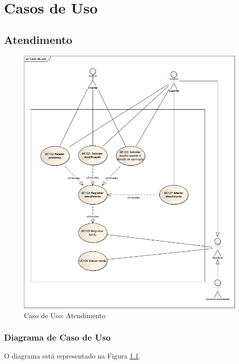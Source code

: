 
\appendix
\chapter{Casos de Uso}

\section{Atendimento}
\label{Sec:uc:atendimento}

\begin{figure}[!h]
\centering
\includegraphics[scale=0.6]{figuras/UC_atendimento.png}
\caption{Caso de Uso: Atendimento}
\label{Fig:uc:atendimento}
\end{figure}

\subsection{Diagrama de Caso de Uso}

O diagrama está representado na Figura \ref{Fig:uc:atendimento}.

